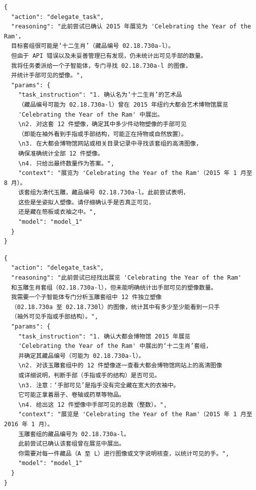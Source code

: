 \begin{tcolorbox}[
  title={\textbf{\small 尝试 3 - 主智能体决策}},
  boxrule=1pt,
  arc=0mm,
  colback=gray!5,
  colframe=gray!70,
  breakable,
  before skip=10pt,
  after skip=10pt,
  pad at break=2mm,
  parbox=false
]
\begin{verbatim}
{
  "action": "delegate_task",
  "reasoning": "此前尝试已确认 2015 年展览为 'Celebrating the Year of the Ram'，
  目标套组很可能是‘十二生肖’（藏品编号 02.18.730a-l）。
  但由于 API 错误以及未妥善管理已有发现，仍未统计出可见手部的数量。
  我将任务委派给一个子智能体，专门寻找 02.18.730a-l 的图像，
  并统计手部可见的塑像。",
  "params": {
    "task_instruction": "1. 确认名为‘十二生肖’的艺术品
    （藏品编号可能为 02.18.730a-l）曾在 2015 年纽约大都会艺术博物馆展览
    'Celebrating the Year of the Ram' 中展出。
    \n2. 对这套 12 件塑像，确定其中多少件动物塑像的手部可见
    （即能在袖外看到手指或手部结构，可能正在持物或自然放置）。
    \n3. 在大都会博物馆网站或相关目录记录中寻找该套组的高清图像，
    确保准确统计全部 12 件塑像。
    \n4. 只给出最终数量作为答案。",
    "context": "展览为 'Celebrating the Year of the Ram'（2015 年 1 月至 8 月）。
    该套组为清代玉雕，藏品编号 02.18.730a-l。此前尝试表明，
    这些是坐姿拟人塑像。请仔细确认手是否真正可见，
    还是藏在笏板或衣袖之中。",
    "model": "model_1"
  }
}
\end{verbatim}
\end{tcolorbox}

\begin{tcolorbox}[
  title={\textbf{\small 尝试 4 - 主智能体决策}},
  boxrule=1pt,
  arc=0mm,
  colback=gray!5,
  colframe=gray!70,
  breakable,
  before skip=10pt,
  after skip=10pt,
  pad at break=2mm,
  parbox=false
]
\begin{verbatim}
{
  "action": "delegate_task",
  "reasoning": "此前尝试已经找出展览 'Celebrating the Year of the Ram'
  和玉雕生肖套组（02.18.730a-l），但未能明确统计出手部可见的塑像数量。
  我需要一个子智能体专门分析玉雕套组中 12 件独立塑像
  （02.18.730a 至 02.18.730l）的图像，统计其中有多少至少能看到一只手
  （袖外可见手指或手部结构）。",
  "params": {
    "task_instruction": "1. 确认大都会博物馆 2015 年展览
    'Celebrating the Year of the Ram' 中展出的‘十二生肖’套组，
    并确定其藏品编号（可能为 02.18.730a-l）。
    \n2. 对该玉雕套组中的 12 件塑像逐一查看大都会博物馆网站上的高清图像
    或详细说明，判断手部（手指或手的结构）是否可见。
    \n3. 注意：‘手部可见’是指手没有完全藏在宽大的衣袖中。
    它可能正拿着扇子、卷轴或药草等物品。
    \n4. 给出这 12 件塑像中手部可见的总数（整数）。",
    "context": "展览是 'Celebrating the Year of the Ram'（2015 年 1 月至 2016 年 1 月）。
    玉雕套组的藏品编号为 02.18.730a-l。
    此前尝试已确认该套组曾在展览中展出。
    你需要对每一件藏品（A 至 L）进行图像或文字说明核查，以统计可见的手。",
    "model": "model_1"
  }
}
\end{verbatim}
\end{tcolorbox}

